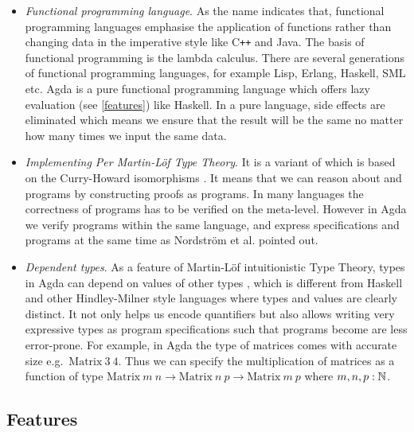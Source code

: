 \begin{itemize}

\item \textit{Functional programming language}. As the name indicates that, functional programming languages emphasise the application of functions rather than changing data in the imperative style like C{}\verb!++! and Java. The basis of functional programming is the lambda calculus. There are several generations of functional programming languages, for example Lisp, Erlang, Haskell, SML etc. 
Agda is a pure functional programming language which offers lazy evaluation (see \autoref{features}) like Haskell. In a pure language, side effects are eliminated which means we ensure that the result will be the same no matter how many times we input the same data. 

\item \textit{Implementing Per Martin-L\"{o}f Type Theory}. It is a variant of \itt which is based on the Curry-Howard isomorphisms \cite{aboa}. It means that we can reason about \maths and programs by constructing proofs as programs. In many languages the correctness of programs has to be verified on the meta-level. However in Agda we verify programs within the same language, and express specifications and  programs at the same time as Nordström et al. \cite{nor:90} pointed out.


\item \textit{Dependent types}. 
As a feature of Martin-L\"{o}f intuitionistic Type Theory, types in Agda can depend on values of other types \cite{dtw}, which is different from Haskell and other Hindley-Milner style languages where types and values are clearly distinct. It not only helps us encode quantifiers but also allows writing very expressive types as program specifications such that programs become are less error-prone.
For example, in Agda the type of matrices comes with accurate size e.g.\ $\text{Matrix}~3~4$. Thus we can specify the multiplication of matrices as a function of type $\text{Matrix}~m~n \to \text{Matrix}~n~p \to \text{Matrix}~m~p$ where $m,n,p : \mathbb{N}$. 
\end{itemize}


\subsection{Features}\label{features}

